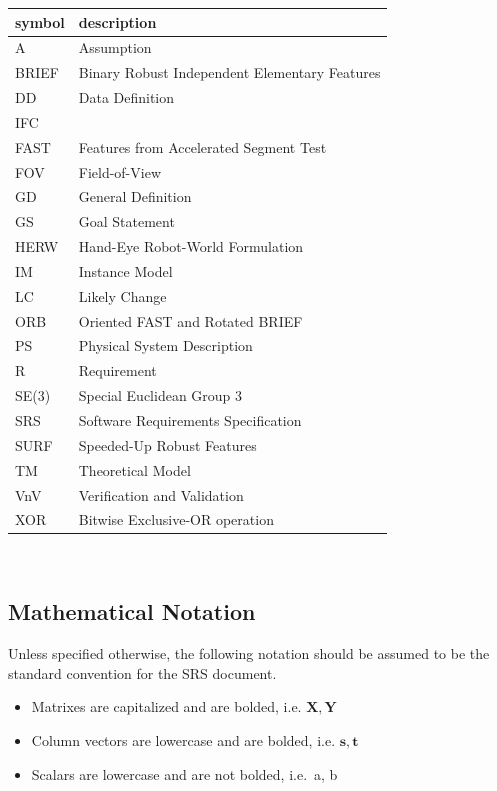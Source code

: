 \documentclass[12pt]{article}
\begin{document}
\renewcommand{\arraystretch}{1.2}
\begin{tabular}{l l} 
  \toprule		
  \textbf{symbol} & \textbf{description}\\
  \midrule 
  A & Assumption\\
  BRIEF & Binary Robust Independent Elementary Features\\ 
  DD & Data Definition\\
  IFC & \progname{}\\
  FAST & Features from Accelerated Segment Test\\
  FOV & Field-of-View\\
  GD & General Definition\\
  GS & Goal Statement\\
  HERW  & Hand-Eye Robot-World Formulation \\
  IM & Instance Model\\
  LC & Likely Change\\
  ORB & Oriented FAST and Rotated BRIEF\\
  PS & Physical System Description\\
  R & Requirement\\
  SE(3) & Special Euclidean Group 3\\
  SRS & Software Requirements Specification\\
  SURF & Speeded-Up Robust Features\\
  TM & Theoretical Model\\
  VnV & Verification and Validation\\
  XOR & Bitwise Exclusive-OR operation\\
  \bottomrule
\end{tabular}\\

\subsection{Mathematical Notation}
Unless specified otherwise, the following notation should be assumed to be the standard 
convention for the SRS document.
\begin{itemize}
  \item Matrixes are capitalized and are bolded, i.e. $\mathbf{X, Y}$
  \item Column vectors are lowercase and are bolded, i.e. $\mathbf{s, t}$
  \item Scalars are lowercase and are not bolded, i.e.\ a, b
\end{itemize}
\end{document}
